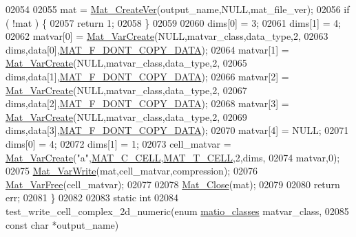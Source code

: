 \begin{DoxyCode}
{{{{{02054 
02055     mat = \hyperlink{group___m_a_t_ga22d404f203af7869c841400e7ad247cf}{Mat\_CreateVer}(output\_name,NULL,mat\_file\_ver);
02056     \textcolor{keywordflow}{if} ( !mat ) \{
02057         \textcolor{keywordflow}{return} 1;
02058     \}
02059 
02060     dims[0] = 3;
02061     dims[1] = 4;
02062     matvar[0] = \hyperlink{group___m_a_t_ga1c54a84bb4d810c6fccdb8869489eac4}{Mat\_VarCreate}(NULL,matvar\_class,data\_type,2,
02063                    dims,data[0],\hyperlink{group___m_a_t_ggab9d6ef9e3ddca78a317b173f01d53fbba762244499f52eb35e7b53fb79a1f2889}{MAT\_F\_DONT\_COPY\_DATA});
02064     matvar[1] = \hyperlink{group___m_a_t_ga1c54a84bb4d810c6fccdb8869489eac4}{Mat\_VarCreate}(NULL,matvar\_class,data\_type,2,
02065                    dims,data[1],\hyperlink{group___m_a_t_ggab9d6ef9e3ddca78a317b173f01d53fbba762244499f52eb35e7b53fb79a1f2889}{MAT\_F\_DONT\_COPY\_DATA});
02066     matvar[2] = \hyperlink{group___m_a_t_ga1c54a84bb4d810c6fccdb8869489eac4}{Mat\_VarCreate}(NULL,matvar\_class,data\_type,2,
02067                    dims,data[2],\hyperlink{group___m_a_t_ggab9d6ef9e3ddca78a317b173f01d53fbba762244499f52eb35e7b53fb79a1f2889}{MAT\_F\_DONT\_COPY\_DATA});
02068     matvar[3] = \hyperlink{group___m_a_t_ga1c54a84bb4d810c6fccdb8869489eac4}{Mat\_VarCreate}(NULL,matvar\_class,data\_type,2,
02069                    dims,data[3],\hyperlink{group___m_a_t_ggab9d6ef9e3ddca78a317b173f01d53fbba762244499f52eb35e7b53fb79a1f2889}{MAT\_F\_DONT\_COPY\_DATA});
02070     matvar[4] = NULL;
02071     dims[0] = 4;
02072     dims[1] = 1;
02073     cell\_matvar = \hyperlink{group___m_a_t_ga1c54a84bb4d810c6fccdb8869489eac4}{Mat\_VarCreate}(\textcolor{stringliteral}{"a"},\hyperlink{group___m_a_t_ggad4d60ae7b709fc81bfd744fb4c857c40a2f7abb47a1c51e248bd4e5e03cc81b08}{MAT\_C\_CELL},\hyperlink{group___m_a_t_ggacf7b3b879282b7ab3a51190e49bf3453a07599cf2cca6d2b2d059378563318ba5}{MAT\_T\_CELL},2,dims,
02074                                   matvar,0);
02075     \hyperlink{group___m_a_t_ga4bd3eba12df415d8226e27c457fbbb0b}{Mat\_VarWrite}(mat,cell\_matvar,compression);
02076     \hyperlink{group___m_a_t_ga1d14716f7450530fd1c9d02413787f0e}{Mat\_VarFree}(cell\_matvar);
02077 
02078     \hyperlink{group___m_a_t_ga101c92ff7bde4a2d4615661beba09262}{Mat\_Close}(mat);
02079 
02080     \textcolor{keywordflow}{return} err;
02081 \}
02082 
02083 \textcolor{keyword}{static} \textcolor{keywordtype}{int}
02084 test\_write\_cell\_complex\_2d\_numeric(\textcolor{keyword}{enum} \hyperlink{group___m_a_t_gad4d60ae7b709fc81bfd744fb4c857c40}{matio\_classes} matvar\_class,
02085     \textcolor{keyword}{const} \textcolor{keywordtype}{char} *output\_name)
}}}}}
\end{DoxyCode}
